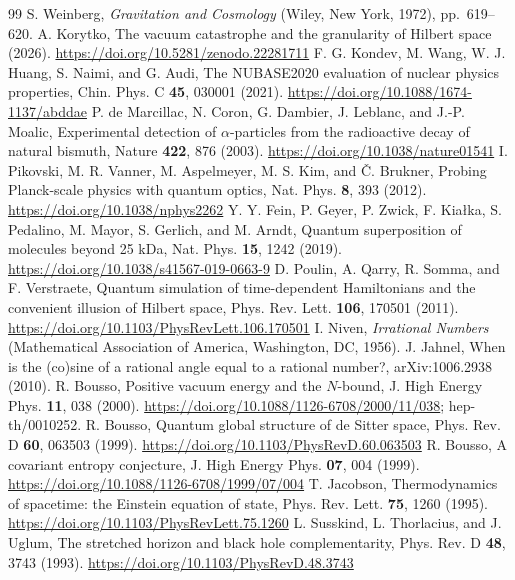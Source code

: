 \documentclass[aps,prd,twocolumn,superscriptaddress,nofootinbib]{revtex4-2}
\begin{document}
\begin{thebibliography}{99}
 S. Weinberg, \emph{Gravitation and Cosmology} (Wiley, New York, 1972), pp.~619--620.
 A. Korytko, The vacuum catastrophe and the granularity of Hilbert space (2026). \url{https://doi.org/10.5281/zenodo.22281711}
 F. G. Kondev, M. Wang, W. J. Huang, S. Naimi, and G. Audi, The NUBASE2020 evaluation of nuclear physics properties, Chin. Phys. C \textbf{45}, 030001 (2021). \url{https://doi.org/10.1088/1674-1137/abddae}
 P. de Marcillac, N. Coron, G. Dambier, J. Leblanc, and J.-P. Moalic, Experimental detection of $\alpha$-particles from the radioactive decay of natural bismuth, Nature \textbf{422}, 876 (2003). \url{https://doi.org/10.1038/nature01541}
 I. Pikovski, M. R. Vanner, M. Aspelmeyer, M. S. Kim, and \v{C}. Brukner, Probing Planck-scale physics with quantum optics, Nat. Phys. \textbf{8}, 393 (2012). \url{https://doi.org/10.1038/nphys2262}
 Y. Y. Fein, P. Geyer, P. Zwick, F. Kia\l{}ka, S. Pedalino, M. Mayor, S. Gerlich, and M. Arndt, Quantum superposition of molecules beyond 25 kDa, Nat. Phys. \textbf{15}, 1242 (2019). \url{https://doi.org/10.1038/s41567-019-0663-9}
 D. Poulin, A. Qarry, R. Somma, and F. Verstraete, Quantum simulation of time-dependent Hamiltonians and the convenient illusion of Hilbert space, Phys. Rev. Lett. \textbf{106}, 170501 (2011). \url{https://doi.org/10.1103/PhysRevLett.106.170501}
 I. Niven, \emph{Irrational Numbers} (Mathematical Association of America, Washington, DC, 1956).
 J. Jahnel, When is the (co)sine of a rational angle equal to a rational number?, arXiv:1006.2938 (2010).
 R. Bousso, Positive vacuum energy and the $N$-bound, J. High Energy Phys. \textbf{11}, 038 (2000). \url{https://doi.org/10.1088/1126-6708/2000/11/038}; hep-th/0010252.
 R. Bousso, Quantum global structure of de Sitter space, Phys. Rev. D \textbf{60}, 063503 (1999). \url{https://doi.org/10.1103/PhysRevD.60.063503}
 R. Bousso, A covariant entropy conjecture, J. High Energy Phys. \textbf{07}, 004 (1999). \url{https://doi.org/10.1088/1126-6708/1999/07/004}
 T. Jacobson, Thermodynamics of spacetime: the Einstein equation of state, Phys. Rev. Lett. \textbf{75}, 1260 (1995). \url{https://doi.org/10.1103/PhysRevLett.75.1260}
 L. Susskind, L. Thorlacius, and J. Uglum, The stretched horizon and black hole complementarity, Phys. Rev. D \textbf{48}, 3743 (1993). \url{https://doi.org/10.1103/PhysRevD.48.3743}

\end{thebibliography}
\end{document}
